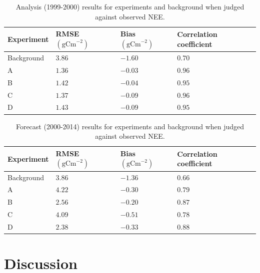 \documentclass[11pt]{article}
\begin{document}
\begin{table}[ht] 
\begin{center}
	\begin{tabular}{| l | l | l | l |}
	\hline
	Experiment & RMSE $( \text{gCm}^{-2})$ & Bias $( \text{gCm}^{-2})$ & Correlation coefficient \\ \hline
	Background & $3.86$ & $-1.60$ & $0.70$ \\ \hline
	A & $1.36$ & $-0.03$ & $0.96$ \\ \hline
	B & $1.42$ & $-0.04$ & $0.95$ \\ \hline
	C & $1.37$ & $-0.09$ & $0.96$ \\ \hline
	D & $1.43$ & $-0.09$ & $0.95$ \\ 
	\hline
	\end{tabular}
	\caption{Analysis (1999-2000) results for experiments and background when judged against observed NEE.}
	\label{table:analysis_res}
\end{center} 
\end{table}

\begin{table}[ht] 
\begin{center}
	\begin{tabular}{| l | l | l | l |}
	\hline
	Experiment & RMSE $( \text{gCm}^{-2})$ & Bias $( \text{gCm}^{-2})$ &  Correlation coefficient \\ \hline
	Background & $3.86$ & $-1.36$ & $0.66$ \\ \hline
	A & $4.22$ & $-0.30$ & $0.79$ \\ \hline
	B & $2.56$ & $-0.20$ & $0.87$ \\ \hline
	C & $4.09$ & $-0.51$ & $0.78$ \\ \hline
	D & $2.38$ & $-0.33$ & $0.88$ \\ 
	\hline
	\end{tabular}
	\caption{Forecast (2000-2014) results for experiments and background when judged against observed NEE.}
	\label{table:forecast_res}
\end{center} 
\end{table}


\section{Discussion}
\end{document}
